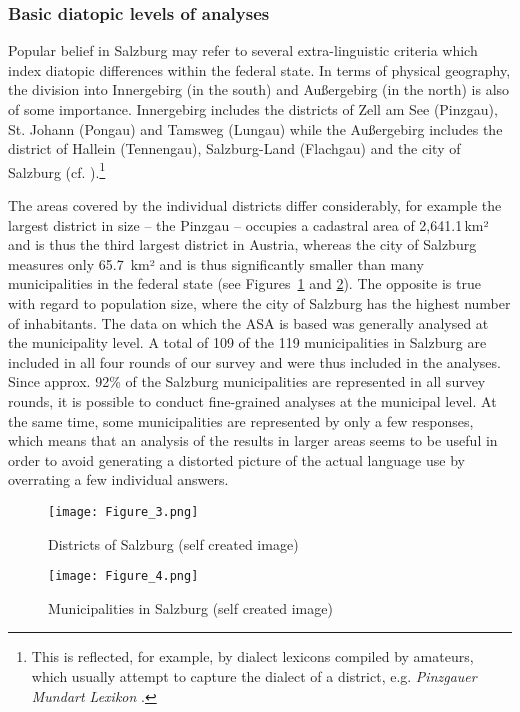 \documentclass[output=paper,colorlinks, citecolor=brown]{langscibook}
\begin{document}
\subsubsection{Basic diatopic levels of analyses} \label{sec:blaßnigg:2.3.2}

Popular belief in Salzburg may refer to several extra-linguistic criteria which index diatopic differences within the federal state. In terms of physical geography, the division into Innergebirg (in the south) and Außergebirg (in the north) is also of some importance. Innergebirg includes the districts of Zell am See (Pinzgau), St. Johann (Pongau) and Tamsweg (Lungau) while the Außergebirg includes the district of Hallein (Tennengau), Salzburg-Land (Flachgau) and the city of Salzburg (cf. ).\footnote{This is reflected, for example, by dialect lexicons compiled by amateurs, which usually attempt to capture the dialect of a district, e.g. \textit{Pinzgauer Mundart Lexikon} \citep{SchwaigerHöck2010}.}

The areas covered by the individual districts differ considerably, for example the largest district in size – the Pinzgau – occupies a cadastral area of 2,641.1\,km² and is thus the third largest district in Austria, whereas the city of Salzburg measures only 65.7~km² and is thus significantly smaller than many municipalities in the federal state (see Figures~\ref{fig:blaßnigg:3} and \ref{fig:blaßnigg:4}). The opposite is true with regard to population size, where the city of Salzburg has the highest number of inhabitants. The data on which the ASA is based was generally analysed at the municipality level. A total of 109 of the 119 municipalities in Salzburg are included in all four rounds of our survey and were thus included in the analyses. Since approx. 92\% of the Salzburg municipalities are represented in all survey rounds, it is possible to conduct fine-grained analyses at the municipal level. At the same time, some municipalities are represented by only a few responses, which means that an analysis of the results in larger areas seems to be useful in order to avoid generating a distorted picture of the actual language use by overrating a few individual answers.

\begin{figure}[p]
\texttt{[image: Figure\_3.png]}
\caption{Districts of Salzburg (self created image)}\label{fig:blaßnigg:3}
\end{figure}

\begin{figure}[p]
\texttt{[image: Figure\_4.png]}
\caption{Municipalities in Salzburg (self created image)}\label{fig:blaßnigg:4}
\end{figure}
\end{document}
